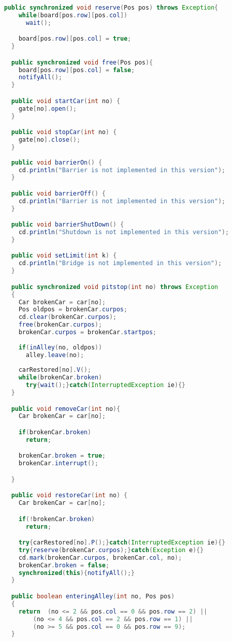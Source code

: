 \begin{lstlisting}[language=java]
  public synchronized void reserve(Pos pos) throws Exception{
    while(board[pos.row][pos.col])
      wait();

    board[pos.row][pos.col] = true;
  }

  public synchronized void free(Pos pos){
    board[pos.row][pos.col] = false;
    notifyAll();
  }

  public void startCar(int no) {
    gate[no].open();
  }

  public void stopCar(int no) {
    gate[no].close();
  }
  
  public void barrierOn() {
    cd.println("Barrier is not implemented in this version");
  }

  public void barrierOff() { 
    cd.println("Barrier is not implemented in this version");
  }

  public void barrierShutDown() { 
    cd.println("Shutdown is not implemented in this version");
  }

  public void setLimit(int k) { 
    cd.println("Bridge is not implemented in this version");
  }

  public synchronized void pitstop(int no) throws Exception
  {
    Car brokenCar = car[no];
    Pos oldpos = brokenCar.curpos;
    cd.clear(brokenCar.curpos);
    free(brokenCar.curpos);
    brokenCar.curpos = brokenCar.startpos;
    
    if(inAlley(no, oldpos))
      alley.leave(no);
    
    carRestored[no].V();
    while(brokenCar.broken)
      try{wait();}catch(InterruptedException ie){}
  }

  public void removeCar(int no){ 
    Car brokenCar = car[no];

    if(brokenCar.broken)
      return;

    brokenCar.broken = true;
    brokenCar.interrupt();

  }

  public void restoreCar(int no) { 
    Car brokenCar = car[no];

    if(!brokenCar.broken)
      return;

    try{carRestored[no].P();}catch(InterruptedException ie){}
    try{reserve(brokenCar.curpos);}catch(Exception e){}
    cd.mark(brokenCar.curpos, brokenCar.col, no);
    brokenCar.broken = false;
    synchronized(this){notifyAll();}
  }

  public boolean enteringAlley(int no, Pos pos)
  {
    return  (no <= 2 && pos.col == 0 && pos.row == 2) ||
        (no <= 4 && pos.col == 2 && pos.row == 1) ||
        (no >= 5 && pos.col == 0 && pos.row == 9);
  }


\end{lstlisting}
